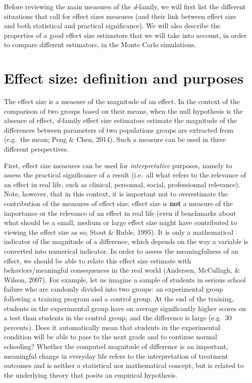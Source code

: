 \documentclass[
  man,floatsintext]{apa6}
\begin{document}
Before reviewing the main measures of the \emph{d}-family, we will first list the different situations that call for effect sizes measures (and their link between effect size and both statistical and practical significance). We will also describe the properties of a good effect size estimators that we will take into account, in order to compare different estimators, in the Monte Carlo simulations.

\hypertarget{effect-size-definition-and-purposes}{%
\section{Effect size: definition and purposes}\label{effect-size-definition-and-purposes}}

The effect size is a measure of the magnitude of an effect. In the context of the comparison of two groups based on their means, when the null hypothesis is the absence of effect, \emph{d}-family effect size estimators estimate the magnitude of the differences between parameters of two populations groups are extracted from (e.g.~the mean; Peng \& Chen, 2014). Such a measure can be used in three different perspectives.

First, effect size measures can be used for \emph{interpretative} purposes, namely to assess the practical significance of a result (i.e.~all what refers to the relevance of an effect in real life, such as clinical, personnal, social, professionnal relevance). Note, however, that in this context, it is important not to overestimate the contribution of the measures of effect size: effect size is \textbf{not} a measure of the importance or the relevance of an effect in real life (even if benchmarks about what should be a small, medium or large effect size might have contributed to viewing the effect size as so; Stout \& Ruble, 1995). It is only a mathematical indicator of the magnitude of a difference, which depends on the way a variable is converted into numerical indicator. In order to assess the meaningfulness of an effect, we should be able to relate this effect size estimate with behaviors/meaningful consequences in the real world (Andersen, McCullagh, \& Wilson, 2007). For example, let us imagine a sample of students in serious school failure who are randomly divided into two groups: an experimental group following a training program and a control group. At the end of the training, students in the experimental group have on average significantly higher scores on a test than students in the control group, and the difference is large (e.g.~30 percents). Does it automatically mean that students in the experimental condition will be able to pass to the next grade and to continue normal schooling? Whether the computed magnitude of difference is an important, meaningful change in everyday life refers to the interpretation of treatment outcomes and is neither a statistical nor mathematical concept, but is related to the underlying theory that posits an empirical hypothesis.
\end{document}

